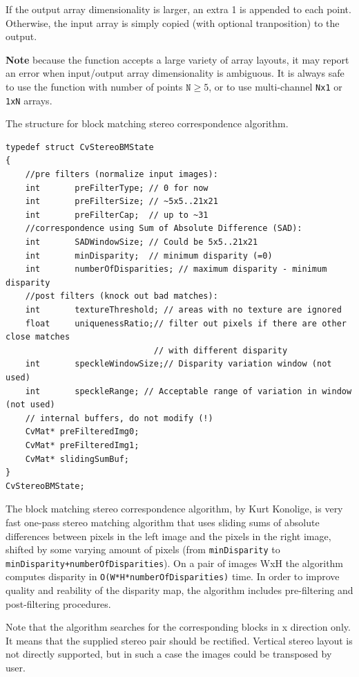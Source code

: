 If the output array dimensionality is larger, an extra 1 is appended to each point.  Otherwise, the input array is simply copied (with optional tranposition) to the output.

\textbf{Note} because the function accepts a large variety of array layouts, it may report an error when input/output array dimensionality is ambiguous. It is always safe to use the function with number of points $\texttt{N} \ge 5$, or to use multi-channel \texttt{Nx1} or \texttt{1xN} arrays.


The structure for block matching stereo correspondence algorithm.

\begin{lstlisting}
typedef struct CvStereoBMState
{
    //pre filters (normalize input images):
    int       preFilterType; // 0 for now
    int       preFilterSize; // ~5x5..21x21
    int       preFilterCap;  // up to ~31
    //correspondence using Sum of Absolute Difference (SAD):
    int       SADWindowSize; // Could be 5x5..21x21
    int       minDisparity;  // minimum disparity (=0)
    int       numberOfDisparities; // maximum disparity - minimum disparity
    //post filters (knock out bad matches):
    int       textureThreshold; // areas with no texture are ignored
    float     uniquenessRatio;// filter out pixels if there are other close matches
                              // with different disparity
    int       speckleWindowSize;// Disparity variation window (not used)
    int       speckleRange; // Acceptable range of variation in window (not used)
    // internal buffers, do not modify (!)
    CvMat* preFilteredImg0;
    CvMat* preFilteredImg1;
    CvMat* slidingSumBuf;
}
CvStereoBMState;
\end{lstlisting}

The block matching stereo correspondence algorithm, by Kurt Konolige, is very fast one-pass stereo matching algorithm that uses sliding sums of absolute differences between pixels in the left image and the pixels in the right image, shifted by some varying amount of pixels (from \texttt{minDisparity} to \texttt{minDisparity+numberOfDisparities}). On a pair of images WxH the algorithm computes disparity in \texttt{O(W*H*numberOfDisparities)} time. In order to improve quality and reability of the disparity map, the algorithm includes pre-filtering and post-filtering procedures.

Note that the algorithm searches for the corresponding blocks in x direction only. It means that the supplied stereo pair should be rectified. Vertical stereo layout is not directly supported, but in such a case the images could be transposed by user.


